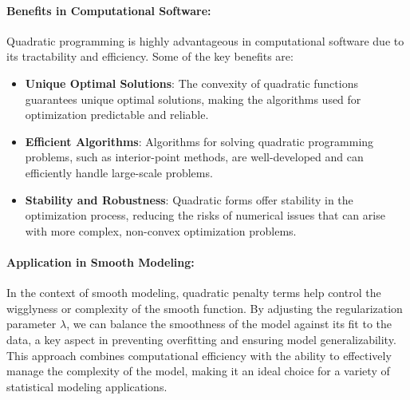 \documentclass[12pt, twoside,hidelinks]{article}
\theoremstyle{definition}
\numberwithin{equation}{section}
\begin{document}
\paragraph{Benefits in Computational Software:}
Quadratic programming is highly advantageous in computational software due to its tractability and efficiency. Some of the key benefits are:
\begin{itemize}
    \item \textbf{Unique Optimal Solutions}: The convexity of quadratic functions guarantees unique optimal solutions, making the algorithms used for optimization predictable and reliable.
    \item \textbf{Efficient Algorithms}: Algorithms for solving quadratic programming problems, such as interior-point methods, are well-developed and can efficiently handle large-scale problems.
    \item \textbf{Stability and Robustness}: Quadratic forms offer stability in the optimization process, reducing the risks of numerical issues that can arise with more complex, non-convex optimization problems.
\end{itemize}

\paragraph{Application in Smooth Modeling:}
In the context of smooth modeling, quadratic penalty terms help control the wigglyness or complexity of the smooth function. By adjusting the regularization parameter \( \lambda \), we can balance the smoothness of the model against its fit to the data, a key aspect in preventing overfitting and ensuring model generalizability. This approach combines computational efficiency with the ability to effectively manage the complexity of the model, making it an ideal choice for a variety of statistical modeling applications.
\end{document}
